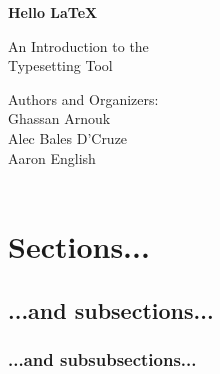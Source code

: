 \documentclass[titlepage, hidelinks, 12pt]{article}%
\begin{document}
    \begin{titlepage}
    \begin{center}
        \vspace*{1cm}
        \Huge
        \textbf{Hello \LaTeX}
        
        \vspace{0.5cm}
        \LARGE
        An Introduction to the\\
        Typesetting Tool
        \vfill
    \end{center}
    \begin{flushright}
        Authors and Organizers:\\
        Ghassan Arnouk\\
        Alec Bales D'Cruze\\
        Aaron English\\
        \\
    \end{flushright}

   \end{titlepage}
    \tableofcontents
    \clearpage
    
    \section{Sections...}
        \subsection{...and subsections...}
            \subsubsection{...and subsubsections...}
\end{document}
